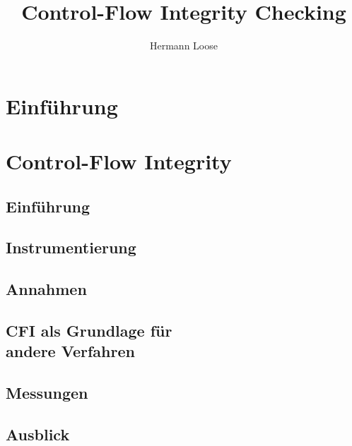 \documentclass[10pt,twocolumn]{article}
\title{Control-Flow Integrity Checking}
\author{Hermann Loose}
\begin{document}
\maketitle

\section{Einführung}


\section{Control-Flow Integrity}

\subsection{Einführung}



\subsection{Instrumentierung}

\subsection{Annahmen}

\subsection{CFI als Grundlage für\\andere Verfahren}

\subsection{Messungen}


\subsection{Ausblick}
\end{document}
